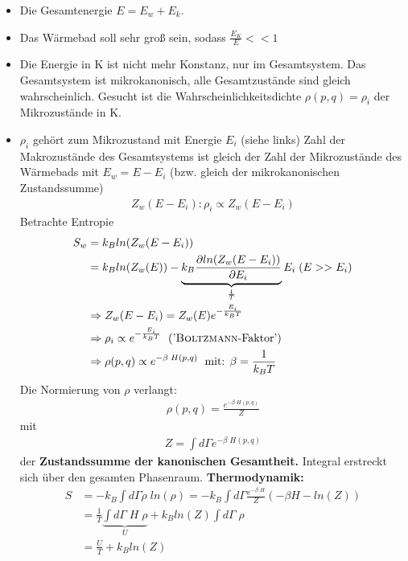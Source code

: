 \documentclass[12pt]{article}
\begin{document}
\begin{itemize}
\item Die Gesamtenergie $E = E_w + E_k$. \\
\item Das Wärmebad soll sehr groß sein, sodass $\frac{E_K}{E} << 1$
\item Die Energie in K ist nicht mehr Konstanz, nur im Gesamtsystem. Das Gesamtsystem ist mikrokanonisch, alle Gesamtzustände sind gleich wahrscheinlich. Gesucht ist die Wahrscheinlichkeitsdichte $\rho (p,q) = \rho_i $ der Mikrozustände in K. 
\item $\rho_i$ gehört zum Mikrozustand mit Energie $E_i$ (siehe links) %
Zahl der Makrozustände des Gesamtsystems ist gleich der Zahl der Mikrozustände des Wärmebads mit $E_w = E - E_i$ (bzw. gleich der mikrokanonischen Zustandssumme) 
\begin{align}
Z_w (E- E_i): \rho_i \propto Z_w (E-E_i)
\end{align}
Betrachte Entropie
\begin{align}
S_w &= k_B ln (Z_w (E-E_i)) \\
&= k_B ln (Z_w (E)) - \underbrace{ k_B \frac{\partial ln (Z_w (E-E_i))}{\partial E_i}}_{ \frac{1}{T}} E_i \; ( E >> E_i) \\
& \Rightarrow Z_w (E-E_i) = Z_w (E) e^{-\frac{E_i}{k_B T}} \\
&\Rightarrow \rho_i \propto e^{- \frac{E_i}{k_B T} } \; \mbox{  ('\textsc{Boltzmann}-Faktor')} \\
&\Rightarrow \rho (p,q) \propto e^{- \beta \; H(p,q)} \; \mbox{ mit: } \beta = \frac{1}{k_B T}
\end{align}
Die Normierung von $\rho$ verlangt: 
\begin{align}
\rho (p,q) = \frac{e^{- \beta \; H(p,q)}}{Z}
\end{align}
mit
\begin{align}
Z = \int d \Gamma e^{- \beta \; H(p,q)}
\end{align}
der \textbf{Zustandssumme der kanonischen Gesamtheit.} Integral erstreckt sich über den gesamten Phasenraum. \textbf{Thermodynamik:}
\begin{align}
S &= -k_B \int d\Gamma \rho \; ln(\rho ) = -k_B \int d\Gamma \frac{e^{- \beta \; H}}{Z} (- \beta H - ln(Z)) \\
&= \frac{1}{T} \underbrace{ \int d\Gamma \; H \; \rho}_U + k_B ln(Z) \int d\Gamma \; \rho \\
&=\frac{U}{T} + k_B ln(Z)
\end{align}
\begin{align}

\end{align}
\end{itemize}
\end{document}
